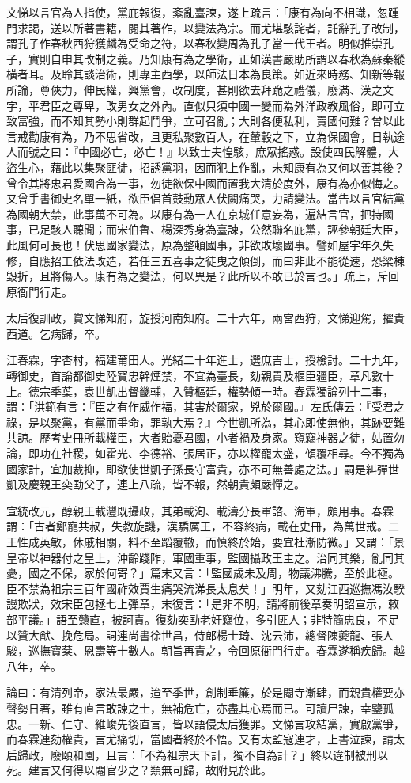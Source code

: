 \begin{pinyinscope}
文悌以言官為人指使，黨庇報復，紊亂臺諫，遂上疏言：「康有為向不相識，忽踵門求謁，送以所著書籍，閱其著作，以變法為宗。而尤堪駭詫者，託辭孔子改制，謂孔子作春秋西狩獲麟為受命之符，以春秋變周為孔子當一代王者。明似推崇孔子，實則自申其改制之義。乃知康有為之學術，正如漢書嚴助所謂以春秋為蘇秦縱橫者耳。及聆其談治術，則專主西學，以師法日本為良策。如近來時務、知新等報所論，尊俠力，伸民權，興黨會，改制度，甚則欲去拜跪之禮儀，廢滿、漢之文字，平君臣之尊卑，改男女之外內。直似只須中國一變而為外洋政教風俗，即可立致富強，而不知其勢小則群起鬥爭，立可召亂；大則各便私利，賣國何難？曾以此言戒勸康有為，乃不思省改，且更私聚數百人，在輦轂之下，立為保國會，日執途人而號之曰：『中國必亡，必亡！』以致士夫惶駭，庶眾搖惑。設使四民解體，大盜生心，藉此以集聚匪徒，招誘黨羽，因而犯上作亂，未知康有為又何以善其後？曾令其將忠君愛國合為一事，勿徒欲保中國而置我大清於度外，康有為亦似悔之。又曾手書御史名單一紙，欲臣倡首鼓動眾人伏闕痛哭，力請變法。當告以言官結黨為國朝大禁，此事萬不可為。以康有為一人在京城任意妄為，遍結言官，把持國事，已足駭人聽聞；而宋伯魯、楊深秀身為臺諫，公然聯名庇黨，誣參朝廷大臣，此風何可長也！伏思國家變法，原為整頓國事，非欲敗壞國事。譬如屋宇年久失修，自應招工依法改造，若任三五喜事之徒曳之傾倒，而曰非此不能從速，恐梁棟毀折，且將傷人。康有為之變法，何以異是？此所以不敢已於言也。」疏上，斥回原衙門行走。

太后復訓政，賞文悌知府，旋授河南知府。二十六年，兩宮西狩，文悌迎駕，擢貴西道。乞病歸，卒。

江春霖，字杏村，福建莆田人。光緒二十年進士，選庶吉士，授檢討。二十九年，轉御史，首論都御史陸寶忠幹煙禁，不宜為臺長，劾親貴及樞臣疆臣，章凡數十上。德宗季葉，袁世凱出督畿輔，入贊樞廷，權勢傾一時。春霖獨論列十二事，謂：「洪範有言：『臣之有作威作福，其害於爾家，兇於爾國。』左氏傳云：『受君之祿，是以聚黨，有黨而爭命，罪孰大焉？』今世凱所為，其心即使無他，其跡要難共諒。歷考史冊所載權臣，大者貽憂君國，小者禍及身家。窺竊神器之徒，姑置勿論，即功在社稷，如霍光、李德裕、張居正，亦以權寵太盛，傾覆相尋。今不獨為國家計，宜加裁抑，即欲使世凱子孫長守富貴，亦不可無善處之法。」嗣是糾彈世凱及慶親王奕劻父子，連上八疏，皆不報，然朝貴頗嚴憚之。

宣統改元，醇親王載灃既攝政，其弟載洵、載濤分長軍諮、海軍，頗用事。春霖謂：「古者鄭寵共叔，失教旋譏，漢驕厲王，不容終病，載在史冊，為萬世戒。二王性成英敏，休戚相關，料不至蹈覆轍，而慎終於始，要宜杜漸防微。」又謂：「景皇帝以神器付之皇上，沖齡踐阼，軍國重事，監國攝政王主之。治同其樂，亂同其憂，國之不保，家於何寄？」篇末又言：「監國歲未及周，物議沸騰，至於此極。臣不禁為祖宗三百年國祚效賈生痛哭流涕長太息矣！」明年，又劾江西巡撫馮汝騤謾欺狀，效宋臣包拯七上彈章，末復言：「是非不明，請將前後章奏明詔宣示，敕部平議。」語至戇直，被訶責。復劾奕劻老奸竊位，多引匪人；非特簡忠良，不足以贊大猷、挽危局。詞連尚書徐世昌，侍郎楊士琦、沈云沛，總督陳夔龍、張人駿，巡撫寶棻、恩壽等十數人。朝旨再責之，令回原衙門行走。春霖遂稱疾歸。越八年，卒。

論曰：有清列帝，家法最嚴，迨至季世，創制垂簾，於是閹寺漸肆，而親貴權要亦聲勢日著，雖有直言敢諫之士，無補危亡，亦盡其心焉而已。可讀尸諫，幸鑒孤忠。一新、仁守、維峻先後直言，皆以語侵太后獲罪。文悌言攻結黨，實啟黨爭，而春霖連劾權貴，言尤痛切，當國者終於不悟。又有太監寇連才，上書泣諫，請太后歸政，廢頤和園，且言：「不為祖宗天下計，獨不自為計？」終以違制被刑以死。建言又何得以閹官少之？類無可歸，故附見於此。


\end{pinyinscope}